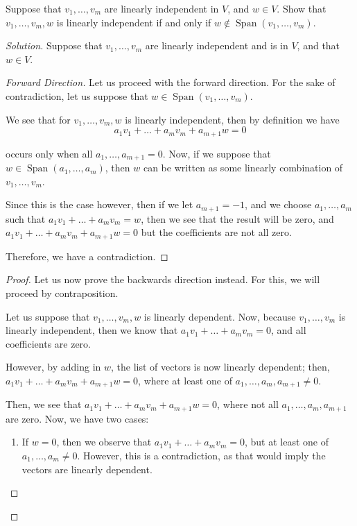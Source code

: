 \documentclass[openany]{book}
\newenvironment{solution}{\begin{proof}[Solution]}{\end{proof}}
\DeclareMathOperator*{\Span}{Span}
\begin{document}
\begin{hw}
	Suppose that $v_{1}, \ldots, v_{m}$ are linearly independent in $V$, and $w \in V$. Show that $v_{1}, \ldots, v_{m}, w$ is linearly independent if and only if $w \not\in \Span(v_{1}, \ldots, v_{m})$.
\end{hw}
\begin{solution}
	Suppose that $v_{1}, \ldots, v_{m}$ are linearly independent and is in $V$, and that $w \in V$.
	
	\begin{proof}[Forward Direction]
		Let us proceed with the forward direction. For the sake of contradiction, let us suppose that $w \in \Span(v_{1}, \ldots, v_{m})$. 
		
		We see that for $v_{1}, \ldots, v_{m}, w$ is linearly independent, then by definition we have
		\begin{equation*}
			a_{1}v_{1} + \ldots + a_{m}v_{m} + a_{m+1}w = 0
		\end{equation*}
		
		occurs only when all $a_{1}, \ldots, a_{m+1} = 0$. Now, if we suppose that $w \in \Span(a_{1}, \ldots, a_{m})$, then $w$ can be written as some linearly combination of $v_{1}, \ldots, v_{m}$.
		
		Since this is the case however, then if we let $a_{m+1} = -1$, and we choose $a_{1}, \ldots, a_{m}$ such that $a_{1}v_{1} + \ldots + a_{m}v_{m} = w$, then we see that the result will be zero, and $a_{1}v_{1} + \ldots + a_{m}v_{m} + a_{m+1}w = 0$ but the coefficients are not all zero.
		
		Therefore, we have a contradiction.
	\end{proof}
	\begin{proof}
		Let us now prove the backwards direction instead. For this, we will proceed by contraposition.
		
		Let us suppose that $v_{1}, \ldots, v_{m}, w$ is linearly dependent. Now, because $v_{1}, \ldots, v_{m}$ is linearly independent, then we know that $a_{1}v_{1} + \ldots + a_{m}v_{m} = 0$, and all coefficients are zero.
		
	 	However, by adding in $w$, the list of vectors is now linearly dependent; then, $a_{1}v_{1} + \ldots + a_{m}v_{m} + a_{m+1}w = 0$, where at least one of $a_{1}, \ldots, a_{m}, a_{m+1} \not= 0$.
	 	
	 	Then, we see that $a_{1}v_{1} + \ldots + a_{m}v_{m} + a_{m+1}w = 0$, where not all $a_{1}, \ldots, a_{m}, a_{m+1}$ are zero. Now, we have two cases:
	 	\begin{enumerate}
	 		\item If $w = 0$, then we observe that $a_{1}v_{1} + \ldots + a_{m}v_{m} = 0$, but at least one of $a_{1}, \ldots, a_{m} \not= 0$. However, this is a contradiction, as that would imply the vectors are linearly dependent.
	 		

\end{enumerate}
\end{proof}
\end{solution}
\end{document}
